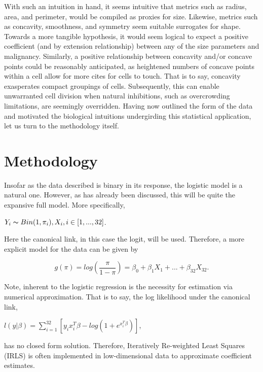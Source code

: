 \documentclass[10pt]{article}
\begin{document}
	With such an intuition in hand, it seems intuitive that metrics such as radius, area, and perimeter, would be compiled as proxies for size.  Likewise, metrics such as concavity, smoothness, and symmetry seem suitable surrogates for shape.  Towards a more tangible hypothesis, it would seem logical to expect a positive coefficient (and by extension relationship) between any of the size parameters and malignancy.   Similarly, a positive relationship between concavity and/or concave points could be reasonably anticipated, as heightened numbers of concave points within a cell allow for more cites for cells to touch.  That is to say, concavity exasperates compact groupings of cells.  Subsequently, this can enable unwarranted cell division when natural inhibitions, such as overcrowding limitations, are seemingly overridden.   Having now outlined the form of the data and motivated the biological intuitions undergirding this statistical application, let us turn to the methodology itself.  
	
	\section{Methodology}
	
	Insofar as the data described is binary in its response, the logistic model is a natural one.  However, as has already been discussed, this will be quite the expansive full model.  More specifically,
	\begin{center}
\label{eqn:model}
$Y_i \thicksim Bin(1,\pi_i), X_i, i \in [1,...,32]$. 
\end{center}  

Here the canonical link, in this case the logit, will be used.  Therefore, a more explicit model for the data can be given by 


\begin{equation}
\label{eqn:model}
g(\pi)=log(\frac{\pi}{1-\pi})=\beta_0+\beta_1X_1+...+\beta_{32}X_{32}.
\end{equation}

  Note, inherent to the logistic regression is the necessity for estimation via numerical approximation.  That is to say, the log likelihood under the canonical link, 
   \begin{center}
  $l(y|\beta)=\sum_{i=1}^{32} [y_ix_i^T\beta-log(1+e^{x_i^T\beta})]$, 
  \end{center}

 has no closed form solution.  Therefore, Iteratively Re-weighted Least Squares (IRLS) is often implemented in low-dimensional data to approximate coefficient estimates.  
  
\end{document}
